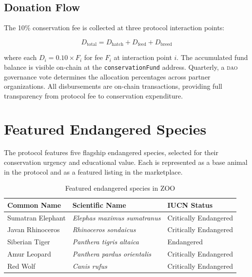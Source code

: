 \documentclass[11pt,letterpaper]{article}
\newcommand{\DAO}{\textsc{dao}}
\begin{document}
\subsection{Donation Flow}

The 10\% conservation fee is collected at three protocol interaction points:

\begin{equation}
D_{\text{total}} = D_{\text{hatch}} + D_{\text{feed}} + D_{\text{breed}}
\end{equation}

where each $D_i = 0.10 \times F_i$ for fee $F_i$ at interaction point $i$.  The
accumulated fund balance is visible on-chain at the \texttt{conservationFund} address.
Quarterly, a \DAO{} governance vote determines the allocation percentages across partner
organizations.  All disbursements are on-chain transactions, providing full transparency
from protocol fee to conservation expenditure.

\section{Featured Endangered Species}
\label{sec:species}

The protocol features five flagship endangered species, selected for their conservation
urgency and educational value.  Each is represented as a base animal in the protocol and
as a featured listing in the marketplace.

\begin{table}[ht]
\centering
\caption{Featured endangered species in ZOO}
\label{tab:species}
\begin{tabular}{lll}
\toprule
Common Name & Scientific Name & IUCN Status \\
\midrule
Sumatran Elephant & \textit{Elephas maximus sumatranus} & Critically Endangered \\
Javan Rhinoceros  & \textit{Rhinoceros sondaicus}       & Critically Endangered \\
Siberian Tiger    & \textit{Panthera tigris altaica}     & Endangered \\
Amur Leopard      & \textit{Panthera pardus orientalis}  & Critically Endangered \\
Red Wolf          & \textit{Canis rufus}                 & Critically Endangered \\
\bottomrule
\end{tabular}
\end{table}
\end{document}

